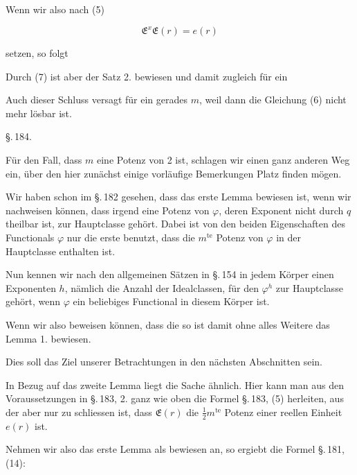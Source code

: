 Wenn wir also nach (5)

\[
\mathfrak{E}^x \mathfrak{E}(r) = e(r)
\]

setzen, so folgt


Durch (7) ist aber der Satz 2. bewiesen und damit zugleich f\"ur ein

Auch dieser Schluss versagt f\"ur ein gerades $m$, weil dann die
Gleichung (6) nicht mehr l\"osbar ist.

\begin{center}
\S.\,184.

\end{center}

F\"ur den Fall, dass $m$ eine Potenz von 2 ist, schlagen wir einen
ganz anderen Weg ein, \"uber den hier zun\"achst einige vorl\"aufige
Bemerkungen Platz finden m\"ogen.

Wir haben schon im \S.\,182 gesehen, dass das erste Lemma bewiesen
ist, wenn wir nachweisen k\"onnen, dass irgend eine Potenz von
$\varphi$, deren Exponent nicht durch $q$ theilbar ist, zur
Hauptclasse geh\"ort. Dabei ist von den beiden Eigenschaften des
Functionals $\varphi$ nur die erste benutzt, dass die $m^{\text{te}}$
Potenz von $\varphi$ in der Hauptclasse enthalten ist.

Nun kennen wir nach den allgemeinen S\"atzen in \S.\,154 in jedem
K\"orper einen Exponenten $h$, n\"amlich die Anzahl der
Idealclassen, f\"ur den $\varphi^h$ zur Hauptclasse geh\"ort, wenn
$\varphi$ ein beliebiges Functional in diesem K\"orper ist.

Wenn wir also beweisen k\"onnen, dass die 
so ist damit ohne alles Weitere das Lemma 1. bewiesen.

Dies soll das Ziel unserer Betrachtungen in den n\"achsten
Abschnitten sein.

In Bezug auf das zweite Lemma liegt die Sache \"ahnlich. Hier kann
man aus den Voraussetzungen in \S.\,183, 2. ganz wie oben die Formel
\S.\,183, (5) herleiten, aus der aber nur zu schliessen ist, dass
$\mathfrak{E}(r)$ die $\frac{1}{2} m^{\text{te}}$ Potenz einer
reellen Einheit $e(r)$ ist.

Nehmen wir also das erste Lemma als bewiesen an, so ergiebt die
Formel \S.\,181, (14):

